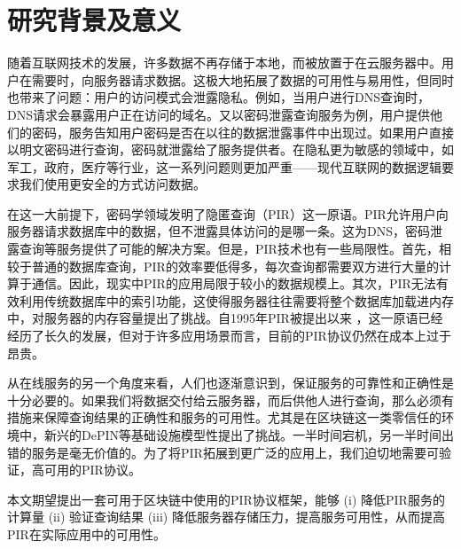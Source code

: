 \section{研究背景及意义}

随着互联网技术的发展，许多数据不再存储于本地，而被放置于在云服务器中。用户在需要时，向服务器请求数据。这极大地拓展了数据的可用性与易用性，但同时也带来了问题：用户的访问模式会泄露隐私。例如，当用户进行DNS查询时，DNS请求会暴露用户正在访问的域名。又以密码泄露查询服务为例，用户提供他们的密码，服务告知用户密码是否在以往的数据泄露事件中出现过。如果用户直接以明文密码进行查询，密码就泄露给了服务提供者。在隐私更为敏感的领域中，如军工，政府，医疗等行业，这一系列问题则更加严重——现代互联网的数据逻辑要求我们使用更安全的方式访问数据。

在这一大前提下，密码学领域发明了隐匿查询（PIR）这一原语。PIR允许用户向服务器请求数据库中的数据，但不泄露具体访问的是哪一条。这为DNS，密码泄露查询等服务提供了可能的解决方案。但是，PIR技术也有一些局限性。首先，相较于普通的数据库查询，PIR的效率要低得多，每次查询都需要双方进行大量的计算于通信。因此，现实中PIR的应用局限于较小的数据规模上。其次，PIR无法有效利用传统数据库中的索引功能，这使得服务器往往需要将整个数据库加载进内存中，对服务器的内存容量提出了挑战。自1995年PIR被提出以来 \cite{FOCS:CGKS95}，这一原语已经经历了长久的发展，但对于许多应用场景而言，目前的PIR协议仍然在成本上过于昂贵。

从在线服务的另一个角度来看，人们也逐渐意识到，保证服务的可靠性和正确性是十分必要的。如果我们将数据交付给云服务器，而后供他人进行查询，那么必须有措施来保障查询结果的正确性和服务的可用性。尤其是在区块链这一类零信任的环境中，新兴的DePIN等基础设施模型性提出了挑战。一半时间宕机，另一半时间出错的服务是毫无价值的。为了将PIR拓展到更广泛的应用上，我们迫切地需要可验证，高可用的PIR协议。

本文期望提出一套可用于区块链中使用的PIR协议框架，能够 (i) 降低PIR服务的计算量 (ii) 验证查询结果 (iii) 降低服务器存储压力，提高服务可用性，从而提高PIR在实际应用中的可用性。